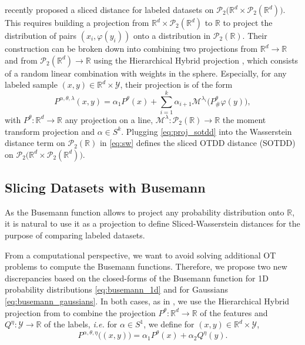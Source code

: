 \documentclass[twoside]{article}
\newcommand{\cP}{\mathcal{P}}
\newcommand{\cY}{\mathcal{Y}}
\newcommand{\cM}{\mathcal{M}}
\newcommand{\cPProd}[1]{\mathcal{P}_2\big(#1 \times \cP_2(#1)\big)}
\newcommand{\R}{\mathbb{R}}
\begin{document}
\citet{nguyen2025lightspeed} recently proposed a sliced distance for labeled datasets on $\cPProd{\R^d}$. This requires building a projection from $\R^d\times\cP_2(\R^d)$ to $\R$ to project the distribution of pairs $(x_i,\varphi(y_i))$ onto a distribution in $\cP_2(\R)$. 
Their construction can be broken down into combining two projections from $\R^d\to\R$ and from $\cP_2(\R^d)\to \R$ using the Hierarchical Hybrid projection \citep{nguyen2024hierarchical}, which consists of a random linear combination with weights in the sphere. Especially, for any labeled sample $(x,y)\in\R^d\times \cY$, their projection is of the form
\begin{equation} \label{eq:proj_sotdd}
    P^{\alpha,\theta,\lambda}(x,y) = \alpha_1 P^\theta(x) + \sum_{i=1}^k \alpha_{i+1} \cM^{\lambda_i}\big(P^\theta_\#\varphi(y)\big),
\end{equation}
with $P^\theta:\R^d\to \R$ any projection on a line, $\cM^\lambda:\cP_2(\R)\to \R$ the moment transform projection and $\alpha\in S^{k}$. %
Plugging \eqref{eq:proj_sotdd} into the Wasserstein distance term on $\cP_2(\R)$ in \eqref{eq:sw} defines the sliced OTDD distance (SOTDD) on $\cPProd{\R^d}$.

























\subsection{Slicing Datasets with Busemann} \label{sec:sliced_busemann}




As the Busemann function allows to project any probability distribution onto $\R$, it is natural to use it as a projection to define Sliced-Wasserstein distances for the purpose of comparing labeled datasets.


From a computational perspective, we want to avoid solving additional OT problems to compute the Busemann functions. Therefore, we propose two new discrepancies based on the closed-forms of the Busemann function for 1D probability distributions \eqref{eq:busemann_1d} and for Gaussians \eqref{eq:busemann_gaussians}. In both cases, as in \citet{nguyen2025lightspeed}, we use the Hierarchical Hybrid projection from \citep{nguyen2024hierarchical} to combine the projection $P^\theta:\R^d\to \R$ of the features and $Q^\eta:\cY\to \R$ of the labels, \emph{i.e.} for $\alpha\in S^1$, we define for $(x,y)\in \R^d\times \cY$,
\begin{equation}
    P^{\alpha,\theta,\eta}\big((x,y)\big) = \alpha_1 P^\theta(x) + \alpha_2 Q^\eta(y).
\end{equation}
\end{document}
